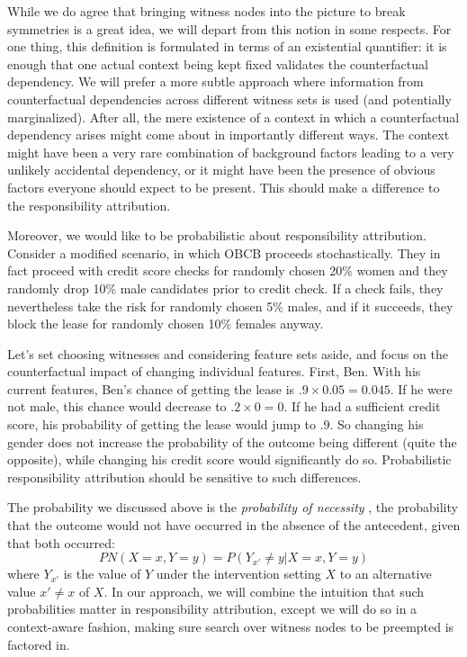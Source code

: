 \documentclass{article}
\begin{document}
While we do agree that bringing witness nodes into the picture to break symmetries is a great idea, we will depart from this notion in some respects. For one thing, this definition is formulated in terms of an existential quantifier: it is enough that one actual context being kept fixed validates the counterfactual dependency. We will prefer a more subtle approach where information from counterfactual dependencies across different witness sets is used (and potentially marginalized). After all, the mere existence of a context in which a counterfactual dependency arises might come about in importantly different ways. The context might have been a very rare combination of background factors leading to a very unlikely accidental dependency, or it might have been the presence of obvious factors everyone should expect to be present. This should make a difference to the responsibility attribution.



Moreover, we would like to be probabilistic about responsibility attribution. Consider a modified scenario, in which OBCB proceeds stochastically. They in fact proceed with credit score checks for randomly chosen 20\% women and they randomly drop 10\% male candidates prior to credit check. If a check fails, they nevertheless take the risk for randomly chosen 5\% males, and if it succeeds, they block the lease for randomly chosen 10\% females anyway.

Let's set choosing witnesses and considering feature sets aside, and focus on the counterfactual impact of changing individual features. First, Ben. With his current features, Ben's chance of getting the lease is $.9 \times 0.05 = 0.045$. If he were not male, this chance would decrease to $.2 \times 0=0$.
If he had a sufficient credit score, his probability of getting the lease would jump to .9.  So changing his gender does not increase the probability of the outcome being different (quite the opposite), while changing his credit score would significantly do so. Probabilistic responsibility attribution should be sensitive to such differences.

The probability we discussed above is the \emph{probability of necessity} \cite{pearl2022probabilities}, the probability that the outcome would not have occurred in the absence of the antecedent, given that both occurred: 
$$ PN(X=x, Y=y) = P(Y_{x'} \neq y \vert X=x, Y=y)$$ where $Y_{x'}$ is the value of $Y$ under the intervention setting $X$ to an alternative value $x'\neq x$ of $X$.  In our approach, we will combine the intuition that such probabilities matter in responsibility attribution, except we will do so in a context-aware fashion, making sure search over witness nodes to be preempted is factored in.
\end{document}
